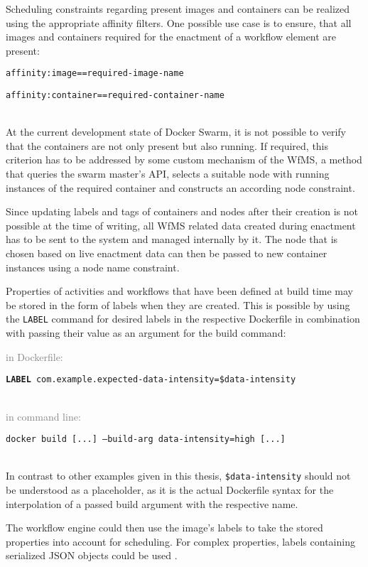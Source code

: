     Scheduling constraints regarding present images and containers can be realized using the appropriate affinity filters. One possible use case is to ensure, that all images and containers required for the enactment of a workflow element are present:
    \\ [0.5ex]
    \centerline{\texttt{affinity:image==required-image-name}}
    \centerline{\texttt{affinity:container==required-container-name}}
    \\ [0.5ex]
    At the current development state of Docker Swarm, it is not possible to verify that the containers are not only present but also running. If required, this criterion has to be addressed by some custom mechanism of the \ac{WfMS}, \eg a method that queries the swarm master's \ac{API}, selects a suitable node with running instances of the required container and constructs an according node constraint.

    Since updating labels and tags of containers and nodes after their creation is not possible at the time of writing, all \ac{WfMS} related data created during enactment has to be sent to the system and managed internally by it. The node that is chosen based on live enactment data can then be passed to new container instances using a node name constraint.

    Properties of activities and workflows that have been defined at build time may be stored in the form of labels when they are created. This is possible by using the \texttt{LABEL} command for desired labels in the respective Dockerfile in combination with passing their value as an argument for the build command:

    \textcolor{gray}{in Dockerfile:}
    \\ [0.5ex]
    \centerline{\texttt{\textbf{LABEL} com.example.expected-data-intensity=\$data-intensity}}
    \\ [0.5ex]
    \textcolor{gray}{in command line:}
    \\ [0.5ex]
    \centerline{\texttt{docker build [...] --build-arg data-intensity=high [...]}}
    \\ [0.5ex]
    In contrast to other examples given in this thesis, \texttt{\$data-intensity} should not be understood as a placeholder, as it is the actual Dockerfile syntax for the interpolation of a passed build argument with the respective name.

    The workflow engine could then use the image's labels to take the stored properties into account for scheduling. For complex properties, labels containing serialized JSON objects could be used \cite{Docker2016Docker}.

